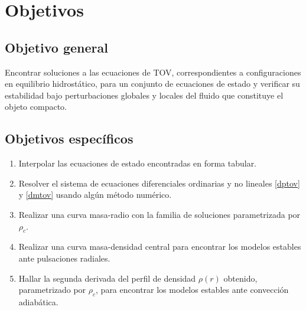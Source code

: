 \chapter{Objetivos}
\section{Objetivo general}
Encontrar soluciones a las ecuaciones de TOV, correspondientes a configuraciones en equilibrio hidrostático, para un conjunto de ecuaciones de estado y verificar su estabilidad bajo perturbaciones globales y locales del fluido que constituye el objeto compacto.
\section{Objetivos específicos}
\begin{enumerate}
    \item Interpolar las ecuaciones de estado encontradas en forma tabular.
    \item Resolver el sistema de ecuaciones diferenciales ordinarias y no lineales \eqref{dptov} y \eqref{dmtov} usando algún método numérico.
    \item Realizar una curva masa-radio con la familia de soluciones parametrizada por $\rho_{c}$.
    \item Realizar una curva masa-densidad central para encontrar los modelos estables ante pulsaciones radiales.
    \item Hallar la segunda derivada del perfil de densidad $\rho(r)$ obtenido, parametrizado por $\rho_c$, para encontrar los modelos estables ante convección adiabática.
\end{enumerate}